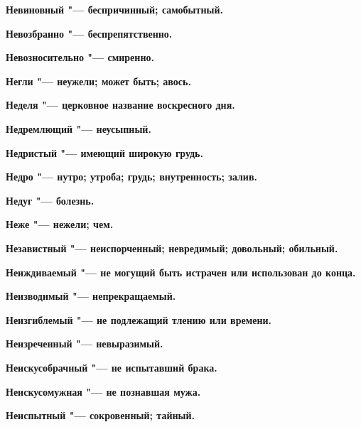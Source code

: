 \bfseries Невиновный \normalfont{} "--- беспричинный; самобытный. 




\bfseries Невозбранно \normalfont{} "--- беспрепятственно. 




\bfseries Невозносительно \normalfont{} "--- смиренно. 




\bfseries Негли \normalfont{} "--- неужели; может быть; авось. 




\bfseries Неделя \normalfont{} "--- церковное название воскресного дня. 




\bfseries Недремлющий \normalfont{} "--- неусыпный. 




\bfseries Недристый \normalfont{} "--- имеющий широкую грудь. 




\bfseries Недро \normalfont{} "--- нутро; утроба; грудь; внутренность; залив. 




\bfseries Недуг \normalfont{} "--- болезнь. 




\bfseries Неже \normalfont{} "--- нежели; чем. 




\bfseries Независтный \normalfont{} "--- неиспорченный; невредимый; довольный; обильный. 




\bfseries Неиждиваемый \normalfont{} "--- не могущий быть истрачен или использован до конца. 




\bfseries Неизводимый \normalfont{} "--- непрекращаемый. 




\bfseries Неизгиблемый \normalfont{} "--- не подлежащий тлению или времени. 




\bfseries Неизреченный \normalfont{} "--- невыразимый. 




\bfseries Неискусобрачный \normalfont{} "--- не испытавший брака. 




\bfseries Неискусомужная \normalfont{} "--- не познавшая мужа. 




\bfseries Неиспытный \normalfont{} "--- сокровенный; тайный. 




